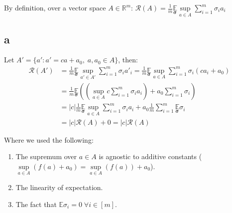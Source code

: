 By definition, over a vector space $A\in \mathbb{R}^m$:  
$\mathcal{R}(A) = \frac{1}{m} \underset{\pmb{\sigma}}{\mathbb{E}} \underset{a\in A}{\sup} \sum_{i=1}^m \sigma_i a_i$

\subsection*{a}
Let $A' = \{a': a' = ca + a_0, \; a, a_0 \in A\}$, then:
\begin{equation*}
    \begin{split}        
        \mathcal{R}(A') &= \frac{1}{m} \underset{\pmb{\sigma}}{\mathbb{E}} \underset{a'\in A'}{\sup} \sum_{i=1}^m \sigma_i a'_i 
        = \frac{1}{m} \underset{\pmb{\sigma}}{\mathbb{E}} \underset{a\in A}{\sup} \sum_{i=1}^m \sigma_i (ca_i + a_0) \\
        &= \frac{1}{m} \underset{\pmb{\sigma}}{\mathbb{E}} \left( \left(\underset{a\in A}{\sup} c \sum_{i=1}^m \sigma_i a_i\right) + a_0 \sum_{i=1}^m \sigma_i\right) \\
        &= |c| \frac{1}{m} \underset{\pmb{\sigma}}{\mathbb{E}} \underset{a\in A}{\sup} \sum_{i=1}^m \sigma_i a_i + a_0 \frac{1}{m} \sum_{i=1}^m \underset{\pmb{\sigma}}{\mathbb{E}} \sigma_i \\
        &= |c|\mathcal{R}(A) + 0 = |c|\mathcal{R}(A)
    \end{split}
\end{equation*}

Where we used the following:
\begin{enumerate}
    \item The supremum over $a\in A$ is agnostic to additive constants ($\underset{a\in A}{\sup} (f(a) + a_0) = \underset{a\in A}{\sup} (f(a)) + a_0$).
    \item The linearity of expectation.
    \item The fact that $\mathbb{E}\sigma_i = 0 \; \forall i\in [m]$.
\end{enumerate}


